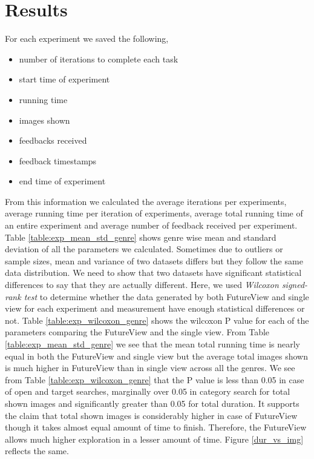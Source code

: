 \documentclass[english]{tktltiki}
\begin{document}
\section{Results}

For each experiment we saved the following,

\begin{itemize}
	\item number of iterations to complete each task
	\item start time of experiment
	\item running time
	\item images shown
	\item feedbacks received
	\item feedback timestamps
	\item end time of experiment
\end{itemize}

From this information we calculated the average iterations per experiments, average running time per iteration of experiments, average total running time of an entire experiment and average number of feedback received per experiment. Table \ref{table:exp_mean_std_genre} shows genre wise mean and standard deviation of all the parameters we calculated. Sometimes due to outliers or sample sizes, mean and variance of two datasets differs but they follow the same data distribution. We need to show that two datasets have significant statistical differences to say that they are actually different. Here, we used \textit{Wilcoxon signed-rank test} \cite{nonparam_stats} to determine whether the data generated by both FutureView and single view for each experiment and measurement have enough statistical differences or not. Table \ref{table:exp_wilcoxon_genre} shows the wilcoxon P value for each of the parameters comparing the FutureView and the single view. From Table \ref{table:exp_mean_std_genre} we see that the mean total running time is nearly equal in both the FutureView and single view but the average total images shown is much higher in FutureView than in single view across all the genres. We see from Table \ref{table:exp_wilcoxon_genre} that the P value is less than 0.05 in case of open and target searches, marginally over 0.05 in category search for total shown images and significantly greater than 0.05 for total duration. It supports the claim that total shown images is considerably higher in case of FutureView though it takes almost equal amount of time to finish. Therefore, the FutureView allows much higher exploration in a lesser amount of time. Figure \ref{dur_vs_img} reflects the same.
\end{document}
